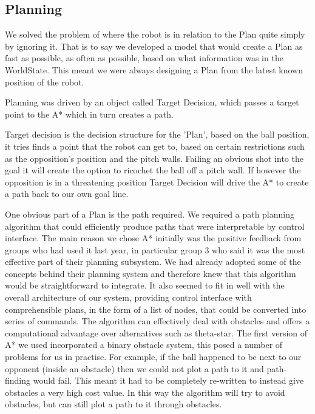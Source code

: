 \subsection{Planning}



We solved the problem of where the robot is in relation to the Plan quite simply
by ignoring it. That is to say we developed a model that would create a Plan
as fast as possible, as often as possible, based on what information was in the WorldState. This meant we were always designing a Plan from the latest known position 
of the robot.

Planning was driven by an object called Target Decision, which passes a target
point to the A* which in turn creates a path.


Target decision is the decision structure for the 'Plan', based on the ball 
position, it tries finds a point that the robot can get to, based on certain 
restrictions such as the opposition's position and the pitch walls. Failing an obvious
shot into the goal it will create the option to ricochet the ball off a pitch
wall. If however the opposition is in a threatening position Target Decision
will drive the A* to create a path back to our own goal line.


One obvious part of a Plan is the path required. We required a path planning 
algorithm that could efficiently produce paths that were interpretable by 
control interface. The main reason we chose A* initially was the positive 
feedback from groups who had used it last year, in particular group 3 who said 
it was the most effective part of their planning subsystem. We had already 
adopted some of the concepts behind their planning system and therefore knew 
that this algorithm would be straightforward to integrate. It also seemed to 
fit in well with the overall architecture of our system, providing control 
interface with comprehensible plans, in the form of a list of nodes, that could 
be converted into series of commands. The algorithm can effectively deal with 
obstacles and offers a computational advantage over alternatives such as theta-star. 
The first version of A* we used incorporated a binary obstacle system, this posed 
a number of problems for us in practise. For example, if the ball happened to be 
next to our opponent (inside an obstacle) then we could not plot a path to it and 
path-finding would fail. This meant it had to be completely re-written to instead 
give obstacles a very high cost value. In this way the algorithm will try to avoid 
obstacles, but can still plot a path to it through obstacles.

